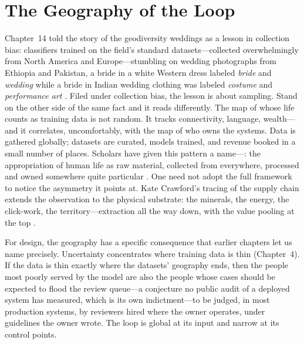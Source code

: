 \section{The Geography of the Loop}
\label{sec:ch18-geography}

Chapter~14 told the story of the geodiversity weddings as a lesson in collection bias: classifiers trained on the field's standard datasets---collected overwhelmingly from North America and Europe---stumbling on wedding photographs from Ethiopia and Pakistan, a bride in a white Western dress labeled \emph{bride} and \emph{wedding} while a bride in Indian wedding clothing was labeled \emph{costume} and \emph{performance art} \autocite{shankar2017geodiversity,zou2018ai}. Filed under collection bias, the lesson is about sampling. Stand on the other side of the same fact and it reads differently. The map of whose life counts as training data is not random. It tracks connectivity, language, wealth---and it correlates, uncomfortably, with the map of who owns the systems. Data is gathered globally; datasets are curated, models trained, and revenue booked in a small number of places. Scholars have given this pattern a name---: the appropriation of human life as raw material, collected from everywhere, processed and owned somewhere quite particular \autocite{couldry2019costs}. One need not adopt the full framework to notice the asymmetry it points at. Kate Crawford's tracing of the \ai supply chain extends the observation to the physical substrate: the minerals, the energy, the click-work, the territory---extraction all the way down, with the value pooling at the top \autocite{crawford2021atlas}.

For \hitl design, the geography has a specific consequence that earlier chapters let us name precisely. Uncertainty concentrates where training data is thin (Chapter~4). If the data is thin exactly where the datasets' geography ends, then the people most poorly served by the model are also the people whose cases should be expected to flood the review queue---a conjecture no public audit of a deployed system has measured, which is its own indictment---to be judged, in most production systems, by reviewers hired where the owner operates, under guidelines the owner wrote. The loop is global at its input and narrow at its control points.

